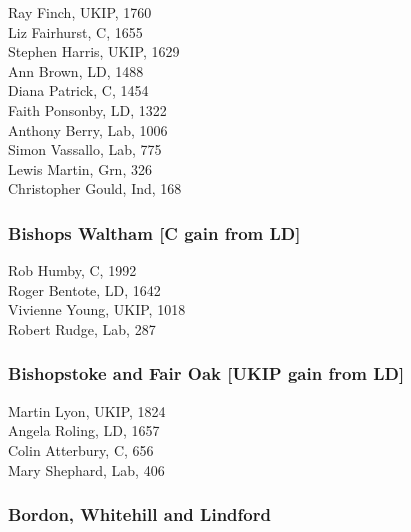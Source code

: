 \documentclass[a4paper,openany,10pt]{book}
\begin{document}


Ray Finch, UKIP, 1760\\
Liz Fairhurst, C, 1655\\
Stephen Harris, UKIP, 1629\\
Ann Brown, LD, 1488\\
Diana Patrick, C, 1454\\
Faith Ponsonby, LD, 1322\\
Anthony Berry, Lab, 1006\\
Simon Vassallo, Lab, 775\\
Lewis Martin, Grn, 326\\
Christopher Gould, Ind, 168\\


\subsubsection*{Bishops Waltham \hspace*{\fill}\nolinebreak[1]%
\enspace\hspace*{\fill}
[C gain from LD]}



Rob Humby, C, 1992\\
Roger Bentote, LD, 1642\\
Vivienne Young, UKIP, 1018\\
Robert Rudge, Lab, 287\\


\subsubsection*{Bishopstoke and Fair Oak \hspace*{\fill}\nolinebreak[1]%
\enspace\hspace*{\fill}
[UKIP gain from LD]}



Martin Lyon, UKIP, 1824\\
Angela Roling, LD, 1657\\
Colin Atterbury, C, 656\\
Mary Shephard, Lab, 406\\


\subsubsection*{Bordon, Whitehill and Lindford}
\end{document}
